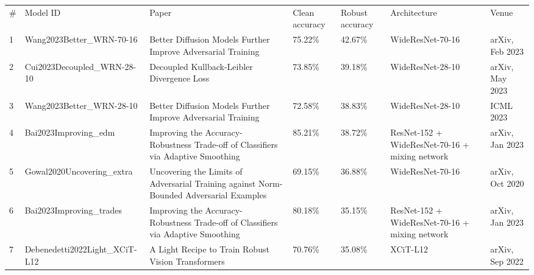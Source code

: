 \begin{table}[]
  \begin{tabular}{lllllll}
  \# & Model ID                                      & Paper                                                                                                              & Clean accuracy & Robust accuracy & Architecture                                   & Venue                \\
  1  & Wang2023Better\_WRN-70-16                     & Better Diffusion Models Further Improve Adversarial Training                                                       & 75.22\%        & 42.67\%         & WideResNet-70-16                               & arXiv, Feb 2023      \\
  2  & Cui2023Decoupled\_WRN-28-10                   & Decoupled Kullback-Leibler Divergence Loss                                                                         & 73.85\%        & 39.18\%         & WideResNet-28-10                               & arXiv, May 2023      \\
  3  & Wang2023Better\_WRN-28-10                     & Better Diffusion Models Further Improve Adversarial Training                                                       & 72.58\%        & 38.83\%         & WideResNet-28-10                               & ICML 2023            \\
  4  & Bai2023Improving\_edm                         & Improving the Accuracy-Robustness Trade-off of Classifiers via Adaptive Smoothing                                  & 85.21\%        & 38.72\%         & ResNet-152 + WideResNet-70-16 + mixing network & arXiv, Jan 2023      \\
  5  & Gowal2020Uncovering\_extra                    & Uncovering the Limits of Adversarial Training against Norm-Bounded Adversarial Examples                            & 69.15\%        & 36.88\%         & WideResNet-70-16                               & arXiv, Oct 2020      \\
  6  & Bai2023Improving\_trades                      & Improving the Accuracy-Robustness Trade-off of Classifiers via Adaptive Smoothing                                  & 80.18\%        & 35.15\%         & ResNet-152 + WideResNet-70-16 + mixing network & arXiv, Jan 2023      \\
  7  & Debenedetti2022Light\_XCiT-L12                & A Light Recipe to Train Robust Vision Transformers                                                                 & 70.76\%        & 35.08\%         & XCiT-L12                                       & arXiv, Sep 2022      \\

\end{tabular}
\end{table}
